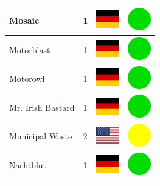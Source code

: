 \documentclass[12pt, a4paper, twoside]{report}
\begin{document}
\begin{center}
\begin{longtable}{|p{5cm}|p{2cm}|p{2cm}|p{2cm}|}
			Mosaic & 1 & \includegraphics[width=1cm]{4x3/de} & \includegraphics[width=1cm]{likes/y} \\ \hline
			Motörblast & 1 & \includegraphics[width=1cm]{4x3/de} & \includegraphics[width=1cm]{likes/y} \\ \hline
			Motorowl & 1 & \includegraphics[width=1cm]{4x3/de} & \includegraphics[width=1cm]{likes/y} \\ \hline
			Mr. Irish Bastard & 1 & \includegraphics[width=1cm]{4x3/de} & \includegraphics[width=1cm]{likes/y} \\ \hline
			Municipal Waste & 2 & \includegraphics[width=1cm]{4x3/us} & \includegraphics[width=1cm]{likes/m} \\ \hline
			Nachtblut & 1 & \includegraphics[width=1cm]{4x3/de} & \includegraphics[width=1cm]{likes/y} \\ \hline

\end{longtable}
\end{center}
\end{document}
